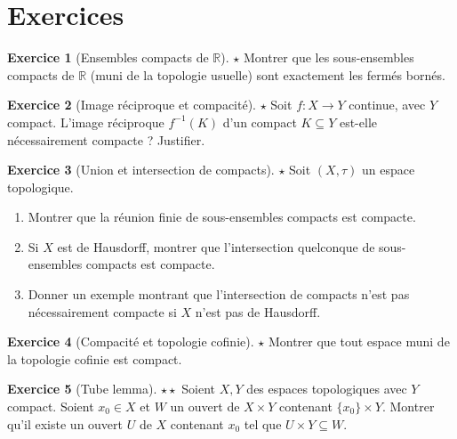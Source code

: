 \documentclass[12pt,a4paper,openany]{book}
\theoremstyle{definition}
\theoremstyle{cours}
\theoremstyle{coursnormal}
\newtheorem{exercice}{Exercice}[chapter]
\newcommand{\R}{\mathbb{R}}
\begin{document}
\section{Exercices}\label{sec:exo-compacite}

\begin{exercice}[Ensembles compacts de $\R$]\label{exo:exo:compacts-R}%
  {\normalfont\textbf{$\star$}}
  Montrer que les sous-ensembles compacts de $\R$ (muni de la topologie
  usuelle) sont exactement les fermés bornés.
\end{exercice}

\begin{exercice}[Image réciproque et compacité]\label{exo:exo:image-reciproque}%
  {\normalfont\textbf{$\star$}}
  Soit $f\colon X\to Y$ continue, avec $Y$ compact. L'image réciproque $f^{-1}(K)$
  d'un compact $K\subseteq Y$ est-elle nécessairement compacte ? Justifier.
\end{exercice}

\begin{exercice}[Union et intersection de compacts]\label{exo:exo:union-intersection}%
  {\normalfont\textbf{$\star$}}
  Soit $(X,\tau)$ un espace topologique.
  \begin{enumerate}
    \item Montrer que la réunion finie de sous-ensembles compacts est compacte.
    \item Si $X$ est de Hausdorff, montrer que l'intersection quelconque de
      sous-ensembles compacts est compacte.
    \item Donner un exemple montrant que l'intersection de compacts n'est pas
      nécessairement compacte si $X$ n'est pas de Hausdorff.
  \end{enumerate}
\end{exercice}

\begin{exercice}[Compacité et topologie cofinie]\label{exo:exo:cofinie-compact}%
  {\normalfont\textbf{$\star$}}
  Montrer que tout espace muni de la topologie cofinie est compact.
\end{exercice}

\begin{exercice}[Tube lemma]\label{exo:exo:tube-lemma}%
  {\normalfont\textbf{$\star\star$}}
  Soient $X,Y$ des espaces topologiques avec $Y$ compact. Soient $x_0\in X$ et
  $W$ un ouvert de $X\times Y$ contenant $\{x_0\}\times Y$. Montrer qu'il
  existe un ouvert $U$ de $X$ contenant $x_0$ tel que $U\times Y\subseteq W$.
\end{exercice}
\end{document}
